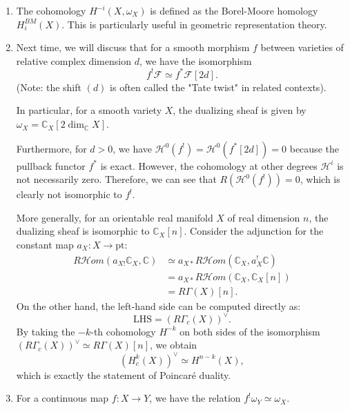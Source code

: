 \begin{remark}
\begin{enumerate}
    \item The cohomology $H^{-i}(X, \omega_X)$ is defined as the Borel-Moore homology $H_i^{BM}(X)$. This is particularly useful in geometric representation theory.
    \item Next time, we will discuss that for a smooth morphism $f$ between varieties of relative complex dimension $d$, we have the isomorphism
    \begin{equation*}
        f^! \mathcal{F} \simeq f^* \mathcal{F}[2d].
    \end{equation*}
    (Note: the shift $(d)$ is often called the "Tate twist" in related contexts). 
    
    In particular, for a smooth variety $X$, the dualizing sheaf is given by $\omega_X = \mathbb{C}_X[2\dim_{\mathbb{C}} X]$.


Furthermore, for $d > 0$, we have $\mathcal{H}^0(f^!) = \mathcal{H}^0(f^*[2d]) = 0$ because the pullback functor $f^*$ is exact. However, the cohomology at other degrees $\mathcal{H}^i$ is not necessarily zero. Therefore, we can see that $R(\mathcal{H}^0(f^!)) = 0$, which is clearly not isomorphic to $f^!$.



More generally, for an orientable real manifold $X$ of real dimension $n$, the dualizing sheaf is isomorphic to $\mathbb{C}_X[n]$. Consider the adjunction for the constant map $a_X \colon X \to \text{pt}$:
\begin{align*}
    R\mathcal{H}om(a_{X!} \mathbb{C}_X, \mathbb{C}) 
    &\simeq a_{X*} R\mathcal{H}om(\mathbb{C}_X, a_X^! \mathbb{C}) \\
    &= a_{X*} R\mathcal{H}om(\mathbb{C}_X, \mathbb{C}_X[n]) \\
    &= R\Gamma(X)[n].
\end{align*}
On the other hand, the left-hand side can be computed directly as:
\begin{equation*}
    \text{LHS} = (R\Gamma_c(X))^\vee.
\end{equation*}
By taking the $-k$-th cohomology $H^{-k}$ on both sides of the isomorphism $(R\Gamma_c(X))^\vee \simeq R\Gamma(X)[n]$, we obtain
\begin{equation*}
    (H^k_c(X))^\vee \simeq H^{n-k}(X),
\end{equation*}
which is exactly the statement of Poincar\'e duality.
\item For a continuous map $f \colon X \to Y$, we have the relation $f^! \omega_Y \simeq \omega_X$.
\end{enumerate}
\end{remark}

